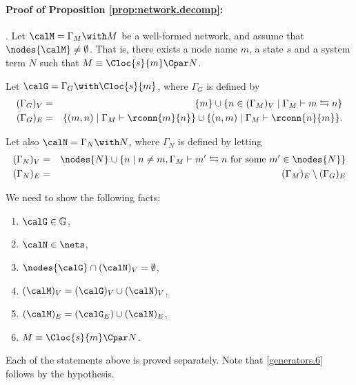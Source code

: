 \documentclass{LMCS}
\begin{document}
\paragraph{\textbf{Proof of Proposition \ref{prop:network.decomp}:}}
\label{proof:generators}.
Let $\calM = \Gamma_M \with M$ be a well-formed network, and assume that 
$\nodes{\calM} \neq \emptyset$. That is, there exists a node name $m$, a state $s$ 
and a system term $N$ such that  $M \equiv 
\Cloc{s}{m} \Cpar N$. 

Let $\calG = \Gamma_G \with \Cloc{s}{m}$, where 
$\Gamma_G$ is defined by 
\begin{eqnarray}
(\Gamma_G)_V &=& \{m\} \cup \{n \in (\Gamma_M)_V \;|\; \Gamma_M \vdash m \leftrightarrows n\}\label{hltest.eq:generators.3}\\
(\Gamma_G)_E &=& \{(m,n) \;|\; \Gamma_M \vdash \rconn{m}{n}\} 
\cup \{(n,m)\;|\; \Gamma_M \vdash \rconn{n}{m}\} \label{hltest.eq:generators.4}.
\end{eqnarray}

Let also $\calN = \Gamma_N \with N$, where $\Gamma_N$ is defined by letting 
\begin{eqnarray}
(\Gamma_N)_V &=& \nodes{N} \cup \{n \;|\; n \neq m, \Gamma_M \vdash m' \leftrightarrows n \mbox{ for some } 
m' \in \nodes{N}\}\label{hltest.eq:generators.1}\\
(\Gamma_N)_E &=& (\Gamma_M)_E \setminus (\Gamma_G)_E\label{hltest.eq:generators.2}
\end{eqnarray}

We need to show the following facts:
\begin{enumerate}
\item \label{generators.1} $\calG \in \mathbb{G}$,
\item \label{generators.2} $\calN \in \nets$, 
\item \label{generators.3} $\nodes{\calG} \cap (\calN)_V = \emptyset$,
\item \label{generators.4} $(\calM)_V = (\calG)_V \cup (\calN)_V$,
\item \label{generators.5} $(\calM)_E = (\calG_E) \cup (\calN)_E$,
\item \label{generators.6} $ M \equiv \Cloc{s}{m} \Cpar N$.
\end{enumerate}

Each of the statements above is proved separately. Note that \eqref{generators.6} 
follows by the hypothesis.
\end{document}
